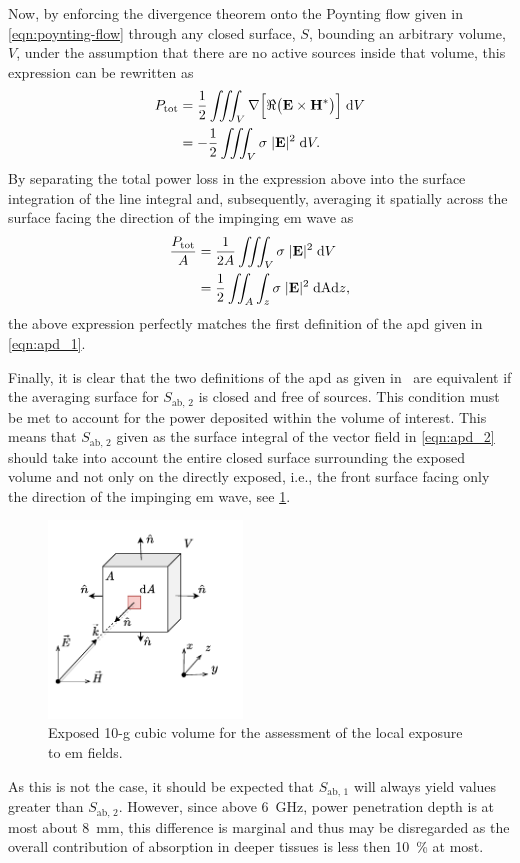 Now, by enforcing the divergence theorem onto the Poynting flow given in \cref{eqn:poynting-flow} through any closed surface, $S$, bounding an arbitrary volume, $V$, under the assumption that there are no active sources inside that volume, this expression can be rewritten as~\cite{Poljak2006Advanced}
\begin{align}
    P_\text{tot} &= \frac{1}{2} \iiint_V \nabla \Big [ \Re \big( \mathbf{E} \times \mathbf{H}^* \big) \Big] \; \mathrm{d}V \notag\\
                 &= -\frac{1}{2} \iiint_V \sigma \; |\mathbf{E}|^2 \; \mathrm{d}V.
\end{align}
By separating the total power loss in the expression above into the surface integration of the line integral and, subsequently, averaging it spatially across the surface facing the direction of the impinging \gls{em} wave as
\begin{align}
    \frac{P_\text{tot}}{A}  &= \frac{1}{2A} \iiint_V \sigma \; |\mathbf{E}|^2 \; \mathrm{d}V \notag\\
                            &= \frac{1}{2} \iint_A \int_z \sigma \; |\mathbf{E}|^2 \; \mathrm{dA}\mathrm{d}z,
\end{align}
the above expression perfectly matches the first definition of the \gls{apd} given in \cref{eqn:apd_1}.

Finally, it is clear that the two definitions of the \gls{apd} as given in~\cite{ICNIRP2020Guidelines} are equivalent if the averaging surface for $S_\text{ab, 2}$ is closed and free of sources.
This condition must be met to account for the power deposited within the volume of interest.
This means that $S_\text{ab, 2}$ given as the surface integral of the vector field in  \cref{eqn:apd_2} should take into account the entire closed surface surrounding the exposed volume and not only on the directly exposed, i.e., the front surface facing only the direction of the impinging \gls{em} wave, see \cref{fig:exposed_tissue_volume}.
\begin{figure}[ht]
    \centering
    \includegraphics[width=0.46\textwidth]{artwork/exposed_tissue_volume.pdf}
    \caption{Exposed 10-g cubic volume for the assessment of the local exposure to \gls{em} fields.}
    \label{fig:exposed_tissue_volume}
\end{figure}
As this is not the case, it should be expected that $S_\text{ab, 1}$ will always yield values greater than $S_\text{ab, 2}$.
However, since above \SI{6}{\GHz}, power penetration depth is at most about \SI{8}{\mm}, this difference is marginal and thus may be disregarded as the overall contribution of absorption in deeper tissues is less then \SI{10}{\percent} at most.

